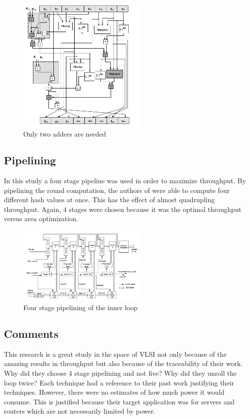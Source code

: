 \documentclass[conference]{IEEEtran}
\begin{document}
\begin{figure}[!t]
\centering
\includegraphics[width=2.5in]{loopunrolling}
\caption{Only two adders are needed}
\label{fig:loopunrolling}
\end{figure}


\subsection{Pipelining}
In this study a four stage pipeline was used in order to maximize throughput. By pipelining the round computation, the authors of \cite{michail} were able to compute four different hash values at once. This has the effect of almost quadrupling throughput. Again, 4 stages were chosen because it was the optimal throughput versus area optimization.  

\begin{figure}[!t]
\centering
\includegraphics[width=2.5in]{archmic}
\caption{Four stage pipelining of the inner loop}
\label{fig:archmic}
\end{figure}

\subsection{Comments}
This research is a great study in the space of VLSI not only because of the amazing results in throughput but also because of the traceability of their work. Why did they choose 4 stage pipelining and not five? Why did they unroll the loop twice? Each technique had a reference to their past work justifying their techniques. However, there were no estimates of how much power it would consume. This is justified because their target application was for servers and routers which are not necessarily limited by power. 
\end{document}
